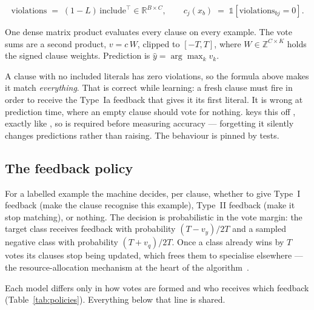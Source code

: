 \[
  \mathrm{violations} \;=\; (1 - L)\, \mathrm{include}^{\!\top} \in \mathbb{R}^{B\times C},
  \qquad
  c_j(x_b) \;=\; \mathbb{1}\!\left[\mathrm{violations}_{bj} = 0\right].
\]

One dense matrix product evaluates every clause on every example. The vote sums are a second
product, $v = c\,W$, clipped to $[-T, T]$, where $W \in \mathbb{Z}^{C\times K}$ holds the
signed clause weights. Prediction is $\hat y = \arg\max_k v_k$.

\begin{ttcallout}
A clause with no included literals has zero violations, so the formula above makes it match
\emph{everything}. That is correct while learning: a fresh clause must fire in order to
receive the Type~Ia feedback that gives it its first literal. It is wrong at prediction time,
where an empty clause should vote for nothing. \ttlibname keys this off ,
exactly like , so  is required before measuring accuracy
--- forgetting it silently changes predictions rather than raising. The behaviour is pinned
by tests.
\end{ttcallout}

\subsection{The feedback policy}

For a labelled example the machine decides, per clause, whether to give Type~I feedback
(make the clause recognise this example), Type~II feedback (make it stop matching), or
nothing. The decision is probabilistic in the vote margin: the target class receives
feedback with probability $(T - v_y)/2T$ and a sampled negative class with probability
$(T + v_q)/2T$. Once a class already wins by $T$ votes its clauses stop being updated, which
frees them to specialise elsewhere --- the resource-allocation mechanism at the heart of the
algorithm~.

Each model differs only in how votes are formed and who receives which feedback
(Table~\ref{tab:policies}). Everything below that line is shared.

